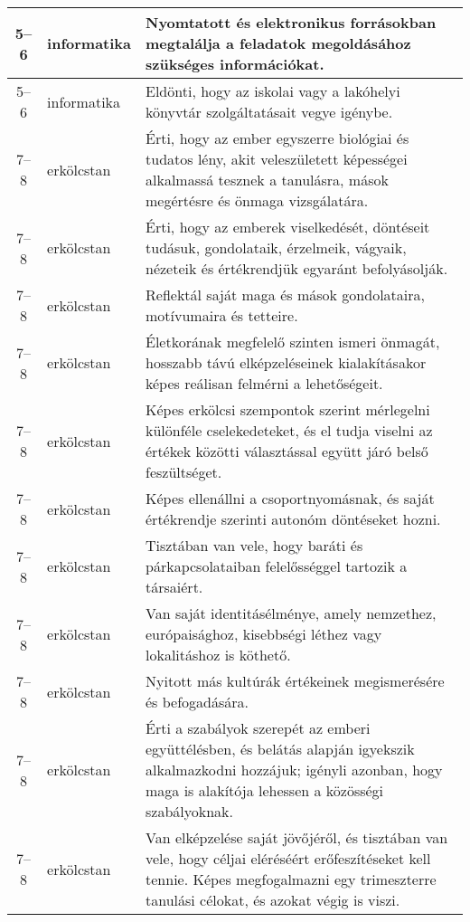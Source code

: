\begin{small}
\begin{longtable}{c | p{2cm} |  p{11cm} }
              5--6 & informatika & Nyomtatott és elektronikus forrásokban megtalálja a feladatok megoldásához szükséges információkat. \\ \hline
              5--6 & informatika & Eldönti, hogy az iskolai vagy a lakóhelyi könyvtár szolgáltatásait vegye igénybe. \\ \hline
              7--8 & erkölcstan & Érti, hogy az ember egyszerre biológiai és tudatos lény, akit veleszületett képességei alkalmassá tesznek a tanulásra, mások megértésre és önmaga vizsgálatára. \\ \hline
              7--8 & erkölcstan & Érti, hogy az emberek viselkedését, döntéseit tudásuk, gondolataik, érzelmeik, vágyaik, nézeteik és értékrendjük egyaránt befolyásolják. \\ \hline
              7--8 & erkölcstan & Reflektál saját maga és mások gondolataira, motívumaira és tetteire. \\ \hline
              7--8 & erkölcstan & Életkorának megfelelő szinten ismeri önmagát, hosszabb távú elképzeléseinek kialakításakor képes reálisan felmérni a lehetőségeit. \\ \hline
              7--8 & erkölcstan & Képes erkölcsi szempontok szerint mérlegelni különféle cselekedeteket, és el tudja viselni az értékek közötti választással együtt járó belső feszültséget. \\ \hline
              7--8 & erkölcstan & Képes ellenállni a csoportnyomásnak, és saját értékrendje szerinti autonóm döntéseket hozni. \\ \hline
              7--8 & erkölcstan & Tisztában van vele, hogy baráti és párkapcsolataiban felelősséggel tartozik a társaiért. \\ \hline
              7--8 & erkölcstan & Van saját identitásélménye, amely nemzethez, európaisághoz, kisebbségi léthez vagy lokalitáshoz is köthető. \\ \hline
              7--8 & erkölcstan & Nyitott más kultúrák értékeinek megismerésére és befogadására. \\ \hline
              7--8 & erkölcstan & Érti a szabályok szerepét az emberi együttélésben, és belátás alapján igyekszik alkalmazkodni hozzájuk; igényli azonban, hogy maga is alakítója lehessen a közösségi szabályoknak. \\ \hline
              7--8 & erkölcstan & Van elképzelése saját jövőjéről, és tisztában van vele, hogy céljai eléréséért erőfeszítéseket kell tennie. Képes megfogalmazni egy trimeszterre tanulási célokat, és azokat végig is viszi. \\ \hline

\end{longtable}
\end{small}

